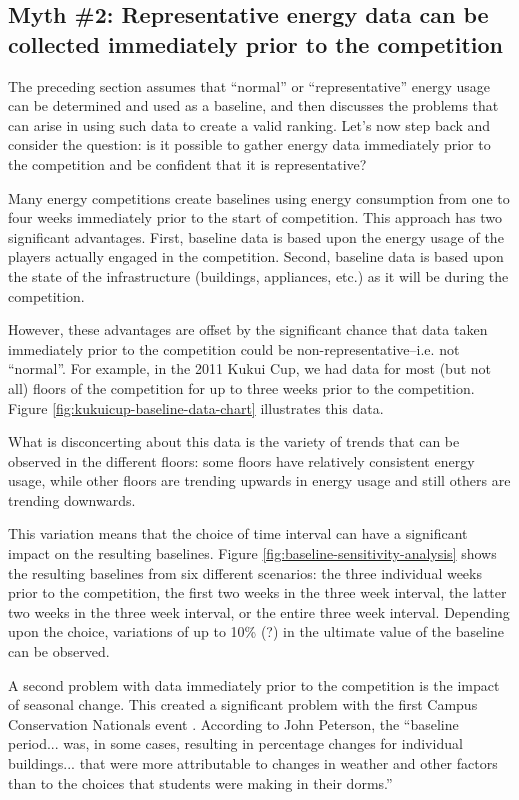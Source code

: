 \documentclass[jou]{apa} %
\begin{document}
\subsection{Myth \#2: Representative energy data can be collected immediately prior to the competition}

The preceding section assumes that ``normal'' or ``representative'' energy usage can be
determined and used as a baseline, and then discusses the problems that can arise in using
such data to create a valid ranking.  Let's now step back and consider the question: is it
possible to gather energy data immediately prior to the competition and be confident that
it is representative?

Many energy competitions create baselines using energy consumption from one to four weeks
immediately prior to the start of competition.  This approach has two significant
advantages. First, baseline data is based upon the energy usage of the players actually
engaged in the competition.  Second, baseline data is based upon the state of the
infrastructure (buildings, appliances, etc.) as it will be during the competition.

However, these advantages are offset by the significant chance that data taken immediately
prior to the competition could be non-representative--i.e. not ``normal''.  For example,
in the 2011 Kukui Cup, we had data for most (but not all) floors of the competition for up
to three weeks prior to the competition.   Figure \ref{fig:kukuicup-baseline-data-chart}
illustrates this data.

What is disconcerting about this data is the variety of trends that can be observed in
the different floors: some floors have relatively consistent energy usage, while other
floors are trending upwards in energy usage and still others are trending downwards. 

This variation means that the choice of time interval can have a significant impact
on the resulting baselines.  Figure \ref{fig:baseline-sensitivity-analysis} shows the resulting
baselines from six different scenarios: the three individual weeks prior to the
competition, the first two weeks in the three week interval, the latter two weeks in the
three week interval, or the entire three week interval.  Depending upon the choice,
variations of up to 10\% (?) in the ultimate value of the baseline can be observed.

A second problem with data immediately prior to the competition is the impact of seasonal
change.   This created a significant problem with the first Campus Conservation Nationals
event \cite{CCN}.  According to John Peterson, the ``baseline period... was, in some
cases, resulting in percentage changes for individual buildings... that were more
attributable to changes in weather and other factors than to the choices that students
were making in their dorms.''
\end{document}
